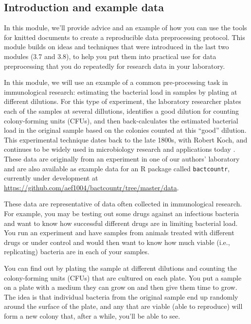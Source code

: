\documentclass[]{tufte-book}
\begin{document}
\subsection{Introduction and example data}\label{introduction-and-example-data}

In this module, we'll provide advice and an example of how you can use the
tools for knitted documents to create a reproducible data preprocessing
protocol. This module builds on ideas and techniques that were introduced
in the last two modules (3.7 and 3.8), to help you put them into practical use for
data preprocessing that you do repeatedly for research data in your
laboratory.

In this module, we will use an example of a common pre-processing task in
immunological research: estimating the bacterial load in samples by plating at
different dilutions. For this type of experiment, the laboratory researcher
plates each of the samples at several dillutions, identifies a good dilution for
counting colony-forming units (CFUs), and then back-calculates the estimated
bacterial load in the original sample based on the colonies counted at this ``good''
dilution. This experimental technique dates back to the late 1800s, with Robert
Koch, and continues to be widely used in microbiology research and applications
today \citep{ben2014estimation}. These data are originally from an experiment in one
of our authors' laboratory and are also available as example data for an R
package called \texttt{bactcountr}, currently under development at
\url{https://github.com/aef1004/bactcountr/tree/master/data}.

These data are representative of data often collected in immunological research.
For example, you may be testing out some drugs against an infectious bacteria
and want to know how successful different drugs are in limiting bacterial load.
You run an experiment and have samples from animals treated with different drugs
or under control and would then want to know how much viable (i.e., replicating)
bacteria are in each of your samples.

You can find out by plating the sample at different dilutions and
counting the colony-forming units (CFUs) that are cultured on each plate.
You put a sample on a plate with a medium they can grow on and then give them
time to grow. The idea is that individual bacteria from the original sample end
up randomly around the surface of the plate, and any that are viable (able to
reproduce) will form a new colony that, after a while, you'll be able to see.
\end{document}
